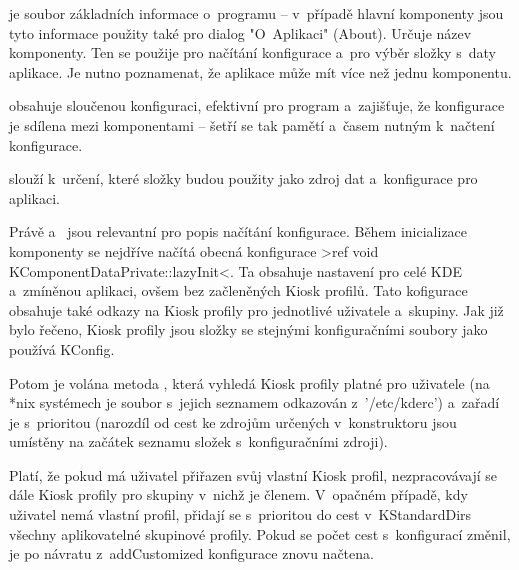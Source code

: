 je soubor základních informace o~programu -- v~případě hlavní komponenty jsou tyto informace použity také pro dialog "O~Aplikaci" (About). Určuje název komponenty. Ten se použije pro načítání konfigurace a~pro výběr složky s~daty aplikace. Je nutno poznamenat, že aplikace může mít více než jednu komponentu.

 obsahuje sloučenou konfiguraci, efektivní pro program a~zajišťuje, že konfigurace je sdílena mezi komponentami -- šetří se tak pamětí a~časem nutným k~načtení konfigurace.

 slouží k~určení, které složky budou použity jako zdroj dat a~konfigurace pro aplikaci.

Právě  a~ jsou relevantní pro popis načítání konfigurace. Během inicializace komponenty se nejdříve načítá obecná konfigurace >ref void KComponentDataPrivate::lazyInit<. Ta obsahuje nastavení pro celé KDE a~zmíněnou aplikaci, ovšem bez začleněných Kiosk profilů. Tato kofigurace obsahuje také odkazy na Kiosk profily pro jednotlivé uživatele a~skupiny. Jak již bylo řečeno, Kiosk profily jsou složky se stejnými konfiguračními soubory jako používá KConfig.

Potom je volána metoda , která vyhledá Kiosk profily platné pro uživatele (na *nix systémech je soubor s~jejich seznamem odkazován z~'/etc/kderc') a~zařadí je s~prioritou (narozdíl od cest ke zdrojům určených v~konstruktoru  jsou umístěny na začátek seznamu složek s~konfiguračními zdroji).

Platí, že pokud má uživatel přiřazen svůj vlastní Kiosk profil, nezpracovávají se dále Kiosk profily pro skupiny v~nichž je členem. V~opačném případě, kdy uživatel nemá vlastní profil, přidají se s~prioritou do cest v~KStandardDirs všechny aplikovatelné skupinové profily. Pokud se počet cest s~konfigurací změnil, je po návratu z~addCustomized konfigurace znovu načtena.


